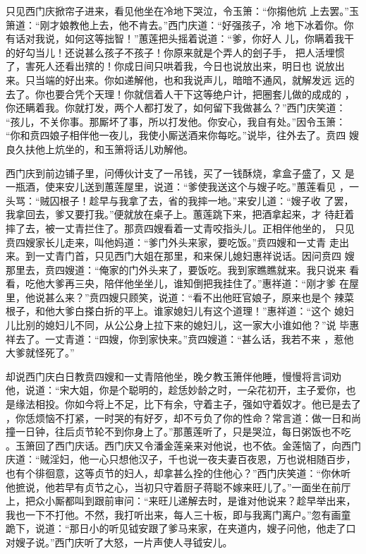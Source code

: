 只见西门庆掀帘子进来，看见他坐在冷地下哭泣，令玉箫：“你搊他炕
上去罢。”玉箫道：“刚才娘教他上去，他不肯去。”西门庆道：“好强孩子，冷
地下冰着你。你有话对我说，如何这等拙智！”蕙莲把头摇着说道：“爹，你好人
儿，你瞒着我干的好勾当儿！还说甚么孩子不孩子！你原来就是个弄人的刽子手，
把人活埋惯了，害死人还看出殡的！你成日间只哄着我，今日也说放出来，明日也
说放出来。只当端的好出来。你如递解他，也和我说声儿，暗暗不通风，就解发远
远的去了。你也要合凭个天理！你就信着人干下这等绝户计，把圈套儿做的成成的
，你还瞒着我。你就打发，两个人都打发了，如何留下我做甚么？”西门庆笑道：
“孩儿，不关你事。那厮坏了事，所以打发他。你安心，我自有处。”因令玉箫：
“你和贲四娘子相伴他一夜儿，我使小厮送酒来你每吃。”说毕，往外去了。贲四
嫂良久扶他上炕坐的，和玉箫将话儿劝解他。

西门庆到前边铺子里，问傅伙计支了一吊钱，买了一钱酥烧，拿盒子盛了，又
是一瓶酒，使来安儿送到蕙莲屋里，说道：“爹使我送这个与嫂子吃。”蕙莲看见
，一头骂：“贼囚根子！趁早与我拿了去，省的我摔一地。”来安儿道：“嫂子收
了罢，我拿回去，爹又要打我。”便就放在桌子上。蕙莲跳下来，把酒拿起来，才
待赶着摔了去，被一丈青拦住了。那贲四嫂看着一丈青咬指头儿。正相伴他坐的，
只见贲四嫂家长儿走来，叫他妈道：“爹门外头来家，要吃饭。”贲四嫂和一丈青
走出来。到一丈青门首，只见西门大姐在那里，和来保儿媳妇惠祥说话。因问贲四
嫂那里去，贲四嫂道：“俺家的门外头来了，要饭吃。我到家瞧瞧就来。我只说来
看看，吃他大爹再三央，陪伴他坐坐儿，谁知倒把我挂住了。”惠祥道：“刚才爹
在屋里，他说甚么来？”贲四嫂只顾笑，说道：“看不出他旺官娘子，原来也是个
辣菜根子，和他大爹白搽白折的平上。谁家媳妇儿有这个道理！”惠祥道：“这个
媳妇儿比别的媳妇儿不同，从公公身上拉下来的媳妇儿，这一家大小谁如他？”说
毕惠祥去了。一丈青道：“四嫂，你到家快来。”贲四嫂道：“甚么话，我若不来
，惹他大爹就怪死了。”

却说西门庆白日教贲四嫂和一丈青陪他坐，晚夕教玉箫伴他睡，慢慢将言词劝
他，说道：“宋大姐，你是个聪明的，趁恁妙龄之时，一朵花初开，主子爱你，也
是缘法相投。你如今将上不足，比下有余，守着主子，强如守着奴才。他已是去了
，你恁烦恼不打紧，一时哭的有好歹，却不亏负了你的性命？常言道：做一日和尚
撞一日钟，往后贞节轮不到你身上了。”那蕙莲听了，只是哭泣，每日粥饭也不吃
。玉箫回了西门庆话。西门庆又令潘金莲亲来对他说，也不依。金莲恼了，向西门
庆道：“贼淫妇，他一心只想他汉子，千也说一夜夫妻百夜恩，万也说相随百步，
也有个徘徊意，这等贞节的妇人，却拿甚么拴的住他心？”西门庆笑道：“你休听
他摭说，他若早有贞节之心，当初只守着厨子蒋聪不嫁来旺儿了。”一面坐在前厅
上，把众小厮都叫到跟前审问：“来旺儿递解去时，是谁对他说来？趁早举出来，
我也一下不打他。不然，我打听出来，每人三十板，即与我离门离户。”忽有画童
跪下，说道：“那日小的听见钺安跟了爹马来家，在夹道内，嫂子问他，他走了口
对嫂子说。”西门庆听了大怒，一片声使人寻钺安儿。

